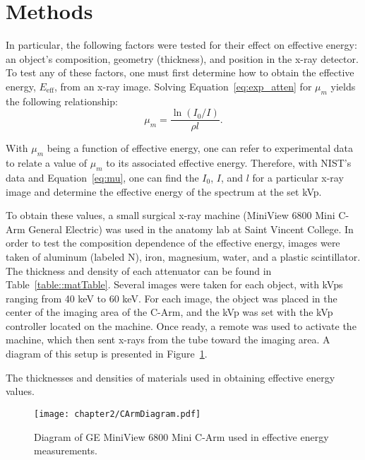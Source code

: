 \section{Methods}
\par In particular, the following factors were tested for their effect on effective energy: an object's composition, geometry (thickness), and position in the x-ray detector. To test any of these factors, one must first determine how to obtain the effective energy, $E_{\text{eff}}$, from an x-ray image. Solving Equation~\ref{eq:exp_atten} for $\mu_m$ yields the following relationship:
\begin{equation}
    \mu_m = \frac{\ln{(I_0/I)}}{\rho l}.
\label{eq:mu}
\end{equation}
\par With $\mu_m$ being a function of effective energy, one can refer to experimental data to relate a value of $\mu_m$ to its associated effective energy. Therefore, with NIST's data \cite{hubbell1982photon} and Equation~\ref{eq:mu}, one can find the $I_0$, $I$, and $l$ for a particular x-ray image and determine the effective energy of the spectrum at the set kVp.

\par To obtain these values, a small surgical x-ray machine (MiniView 6800 Mini C-Arm General Electric) was used in the anatomy lab at Saint Vincent College. In order to test the composition dependence of the effective energy, images were taken of aluminum (labeled N), iron, magnesium, water, and a plastic scintillator. The thickness and density of each attenuator can be found in Table~\ref{table::matTable}. Several images were taken for each object, with kVps ranging from 40 keV to 60 keV. For each image, the object was placed in the center of the imaging area of the C-Arm, and the kVp was set with the kVp controller located on the machine. Once ready, a remote was used to activate the machine, which then sent x-rays from the tube toward the imaging area. A diagram of this setup is presented in Figure~\ref{figure:CArmDiagram}.

\begin{table}[H]
	\centering
    
    \caption{The thicknesses and densities of materials used in obtaining effective energy values.}
    \label{table::matTable}
\end{table}

\begin{figure}[H]
    \centering
	\texttt{[image: chapter2/CArmDiagram.pdf]}
	\caption{Diagram of GE MiniView 6800 Mini C-Arm used in effective energy measurements.}
	\label{figure:CArmDiagram}
\end{figure}

